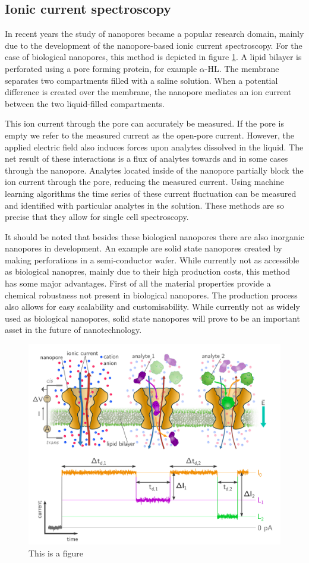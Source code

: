 \subsection{Ionic current spectroscopy}
In recent years the study of nanopores became a popular research domain, mainly
due to the development of the nanopore-based ionic current spectroscopy. For the case of
biological nanopores, this method is depicted in figure \ref{fig:IonicCurrentSpec}. A
lipid bilayer is perforated using a pore forming protein, for example $\alpha$-HL. The
membrane separates two compartments filled with a saline solution. When a potential
difference is created over the membrane, the nanopore mediates an ion current between the
two liquid-filled compartments.

This ion current through the pore can accurately be measured. If the pore is empty we
refer to the measured current as the open-pore current. However, the applied electric
field also induces forces upon analytes dissolved in the liquid. The net result of these
interactions is a flux of analytes towards and in some cases through the nanopore.
Analytes located inside of the nanopore partially block the ion current through the pore,
reducing the measured current. Using machine learning algorithms the time series of
these current fluctuation can be measured and identified with particular analytes in the
solution. These methods are so precise that they allow for single cell
spectroscopy.\cite{Howorka2009}

It should be noted that besides these biological nanopores there are also inorganic
nanopores in development\cite{Dekker2007}. An example are solid state nanopores created
by
making
perforations in a semi-conductor wafer. While currently not as accessible as biological
nanopres, mainly due to their high production costs, this method has some major
advantages.  First of all the material properties provide a chemical robustness not
present in biological nanopores. The production process also allows for easy scalability
and customisability. While currently not as widely used as biological nanopores, solid
state nanopores will prove to be an important asset in the future of nanotechnology.

\begin{figure}[htpb]
  \centering
  \includegraphics[width=0.6\linewidth]{Figures/IonicCurrentSpec.png}
  \caption{This is a figure}
  \label{fig:IonicCurrentSpec}
\end{figure}
